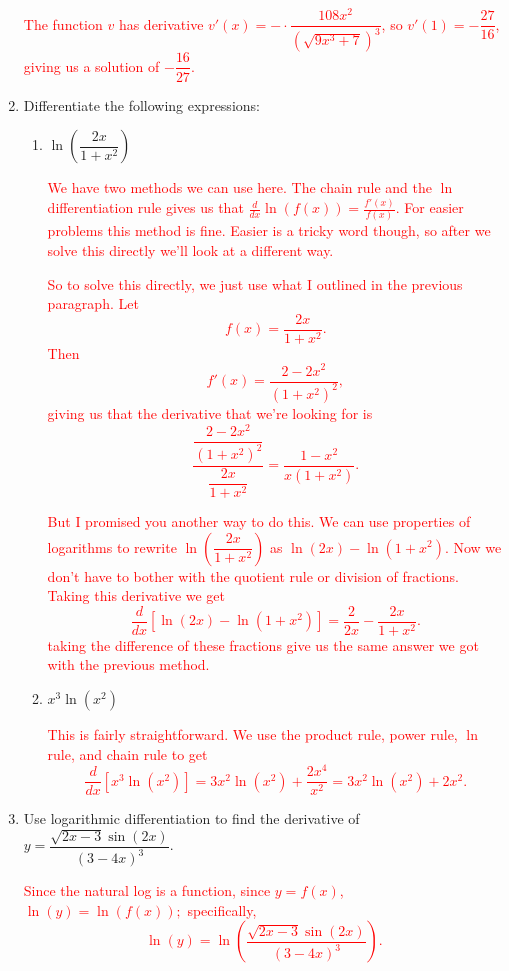 \documentclass[11pt]{article}
\newcommand{\red}{\textcolor{red}}
\begin{document}
\begin{enumerate}
        \red{The function $v$ has derivative $v'(x)=-\cdot\dfrac{108x^2}{(\sqrt{9x^3+7})^{3}}$, so $v'(1)=-\dfrac{27}{16}$, giving us a solution of $-\dfrac{16}{27}$.}
        
        \item Differentiate the following expressions:
        \begin{enumerate}
            \item $\ln\left(\dfrac{2x}{1+x^{2}}\right)$

            \red{We have two methods we can use here. The chain rule and the $\ln$ differentiation rule gives us that $\frac{d}{dx}\ln(f(x))=\frac{f'(x)}{f(x)}$. For easier problems this method is fine. Easier is a tricky word though, so after we solve this directly we'll look at a different way.}

            \red{So to solve this directly, we just use what I outlined in the previous paragraph. Let $$f(x)=\dfrac{2x}{1+x^{2}}.$$ Then $$f'(x)=\frac{2-2x^{2}}{(1+x^{2})^{2}},$$ giving us that the derivative that we're looking for is $$\frac{\dfrac{2-2x^{2}}{(1+x^{2})^{2}}}{\dfrac{2x}{1+x^{2}}}=\frac{1-x^{2}}{x(1+x^{2})}.$$}

            \red{But I promised you another way to do this. We can use properties of logarithms to rewrite $\ln\left(\dfrac{2x}{1+x^{2}}\right)$ as $\ln(2x)-\ln(1+x^{2})$. Now we don't have to bother with the quotient rule or division of fractions. Taking this derivative we get $$\frac{d}{dx}\left[\ln(2x)-\ln(1+x^{2})\right]=\frac{2}{2x}-\frac{2x}{1+x^{2}}.$$ taking the difference of these fractions give us the same answer we got with the previous method.}
            
            \item $x^{3}\ln(x^{2})$

            \red{This is fairly straightforward. We use the product rule, power rule, $\ln$ rule, and chain rule to get $$\frac{d}{dx}\left[x^{3}\ln(x^{2})\right]=3x^{2}\ln(x^{2})+\frac{2x^4}{x^{2}}=3x^{2}\ln(x^{2})+2x^{2}.$$}
            
        \end{enumerate}
        \item Use logarithmic differentiation to find the derivative of $y=\dfrac{\sqrt{2x-3}\sin(2x)}{(3-4x)^{3}}$.
        
            \red{Since the natural log is a function, since $y=f(x)$, $\ln(y)=\ln(f(x));$ specifically, $$\ln(y)=\ln\left(\dfrac{\sqrt{2x-3}\sin(2x)}{(3-4x)^{3}}\right).$$}


\end{enumerate}
\end{document}
